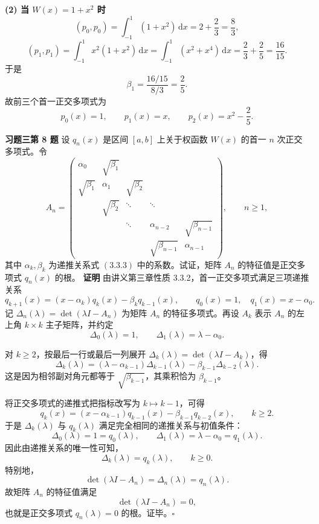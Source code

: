 \documentclass[UTF8,a4paper,11pt]{ctexart}
\newcommand*{\QED}{\hfill\ensuremath{\square}}
\newcommand{\inner}[2]{\left(#1,#2\right)}
\begin{document}
\medskip
\noindent\textbf{(2) 当 $W(x)=1+x^2$ 时}\quad
\[
  \inner{p_0}{p_0}=\int_{-1}^1 (1+x^2)\,\mathrm{d}x
  =2+\frac{2}{3}
  =\frac{8}{3},
\]
\[
  \inner{p_1}{p_1}=\int_{-1}^1 x^2(1+x^2)\,\mathrm{d}x
  =\int_{-1}^1 (x^2+x^4)\,\mathrm{d}x
  =\frac{2}{3}+\frac{2}{5}
  =\frac{16}{15}.
\]
于是
\[
  \beta_1=\frac{16/15}{8/3}=\frac{2}{5}.
\]
故前三个首一正交多项式为
\[
  \boxed{
  p_0(x)=1,\qquad
  p_1(x)=x,\qquad
  p_2(x)=x^2-\frac{2}{5}.}
\]

\bigskip\bigskip

\noindent\textbf{习题三\quad 第 8 题}\quad
设 $q_n(x)$ 是区间 $[a,b]$ 上关于权函数 $W(x)$ 的首一 $n$ 次正交多项式。令
\[
  A_n=
  \begin{pmatrix}
    \alpha_0 & \sqrt{\beta_1} &        &        &   \\
    \sqrt{\beta_1} & \alpha_1 & \sqrt{\beta_2} &        &   \\
        & \sqrt{\beta_2} & \ddots & \ddots &   \\
        &        & \ddots & \alpha_{n-2} & \sqrt{\beta_{n-1}} \\
        &        &        & \sqrt{\beta_{n-1}} & \alpha_{n-1}
  \end{pmatrix},
  \qquad n\ge 1,
\]
其中 $\alpha_k,\beta_k$ 为递推关系式 $(3.3.3)$ 中的系数。试证，矩阵 $A_n$ 的特征值是正交多项式
$q_n(x)$ 的根。
\medskip
\noindent\textbf{证明}\quad
由讲义第三章性质 3.3.2，首一正交多项式满足三项递推关系
\[
  q_{k+1}(x)=(x-\alpha_k)q_k(x)-\beta_k q_{k-1}(x),
  \qquad q_0(x)=1,\quad q_1(x)=x-\alpha_0.
\]
记 $\Delta_n(\lambda)=\det(\lambda I-A_n)$ 为矩阵 $A_n$ 的特征多项式。再设
$A_k$ 表示 $A_n$ 的左上角 $k\times k$ 主子矩阵，并约定
\[
  \Delta_0(\lambda)=1,\qquad \Delta_1(\lambda)=\lambda-\alpha_0.
\]

对 $k\ge 2$，按最后一行或最后一列展开 $\Delta_k(\lambda)=\det(\lambda I-A_k)$，得
\[
  \Delta_k(\lambda)
  =(\lambda-\alpha_{k-1})\Delta_{k-1}(\lambda)-\beta_{k-1}\Delta_{k-2}(\lambda).
\]
这是因为相邻副对角元都等于 $\sqrt{\beta_{k-1}}$，其乘积恰为 $\beta_{k-1}$。

将正交多项式的递推式把指标改写为 $k\mapsto k-1$，可得
\[
  q_k(x)=(x-\alpha_{k-1})q_{k-1}(x)-\beta_{k-1}q_{k-2}(x),
  \qquad k\ge 2.
\]
于是 $\Delta_k(\lambda)$ 与 $q_k(\lambda)$ 满足完全相同的递推关系与初值条件：
\[
  \Delta_0(\lambda)=1=q_0(\lambda),\qquad
  \Delta_1(\lambda)=\lambda-\alpha_0=q_1(\lambda).
\]
因此由递推关系的唯一性可知，
\[
  \Delta_k(\lambda)=q_k(\lambda),\qquad k\ge 0.
\]
特别地，
\[
  \det(\lambda I-A_n)=\Delta_n(\lambda)=q_n(\lambda).
\]
故矩阵 $A_n$ 的特征值满足
\[
  \det(\lambda I-A_n)=0,
\]
也就是正交多项式 $q_n(\lambda)=0$ 的根。证毕。\QED
\end{document}
